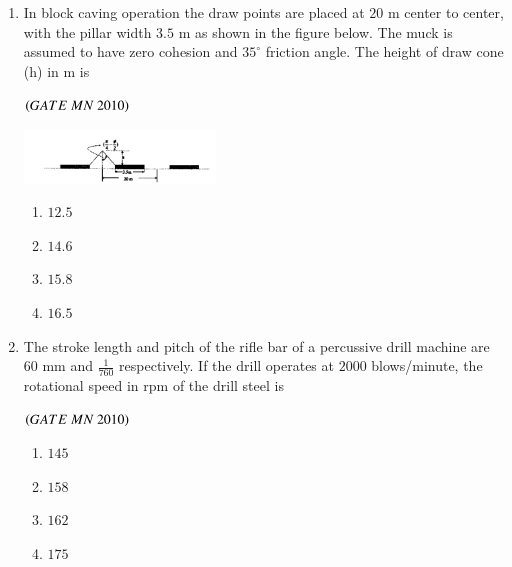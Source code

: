 \documentclass{article}
\begin{document}
\begin{enumerate}[label=Q.\arabic*., itemsep=1em, leftmargin=0pt, itemindent=*, labelsep=0.5em]
\begin{enumerate}[label=Q.\arabic*., start=17, leftmargin=2em]
\begin{enumerate}[label=Q.\arabic*., start=33, leftmargin=2em]
\begin{multicols}{4}
\begin{enumerate}[label=(\Alph*),leftmargin=4em]
\item $5.60$
\item $4.50$
\item $25$
\item $4.15$
\end{enumerate}
\end{multicols}
\bigskip
\item In block caving operation the draw points are placed at $20$ m center to center, with the pillar width
$3.5$ m as shown in the figure below. The muck is assumed to have zero cohesion and $35^\circ$ friction
angle. The height of draw cone (h) in m is
\\
\begin{flushright}
\hfill$\left(GATE\ MN\ 2010\right)$
\end{flushright}
\begin{center}
\includegraphics[width=0.4\textwidth]{figs/45.png}
\end{center}
\begin{multicols}{4}
\begin{enumerate}[label=(\Alph*),leftmargin=4em]
\item $12.5 $
\item $14.6$
\item $15.8$
\item $ 16.5$
\end{enumerate}
\end{multicols}
\bigskip
\item The stroke length and pitch of the rifle bar of a percussive drill machine are $60$ mm and $\frac{1}{760}$
respectively. If the drill operates at $2000$ blows/minute, the rotational speed in rpm of the drill steel is
\\
\begin{flushright}
\hfill$\left(GATE\ MN\ 2010\right)$
\end{flushright}
\begin{multicols}{4}
\begin{enumerate}[label=(\Alph*),leftmargin=4em]
\item $145$
\item $158$
\item $162$
\item $175$
\end{enumerate}
\end{multicols}
\bigskip

\end{enumerate}
\end{enumerate}
\end{enumerate}
\end{document}
